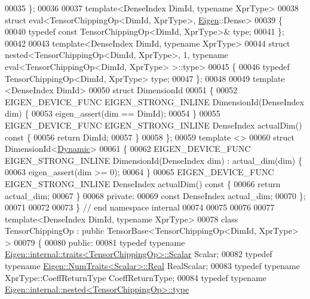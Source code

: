 \begin{DoxyCode}
00035 \};
00036 
00037 \textcolor{keyword}{template}<DenseIndex DimId, \textcolor{keyword}{typename} XprType>
00038 \textcolor{keyword}{struct }eval<TensorChippingOp<DimId, XprType>, \hyperlink{namespace_eigen}{Eigen}::Dense>
00039 \{
00040   \textcolor{keyword}{typedef} \textcolor{keyword}{const} TensorChippingOp<DimId, XprType>& type;
00041 \};
00042 
00043 \textcolor{keyword}{template}<DenseIndex DimId, \textcolor{keyword}{typename} XprType>
00044 \textcolor{keyword}{struct }nested<TensorChippingOp<DimId, XprType>, 1, typename eval<TensorChippingOp<DimId, XprType> >::type>
00045 \{
00046   \textcolor{keyword}{typedef} TensorChippingOp<DimId, XprType> type;
00047 \};
00048 
00049 \textcolor{keyword}{template} <DenseIndex DimId>
00050 \textcolor{keyword}{struct }DimensionId
00051 \{
00052   EIGEN\_DEVICE\_FUNC EIGEN\_STRONG\_INLINE DimensionId(DenseIndex dim) \{
00053     eigen\_assert(dim == DimId);
00054   \}
00055   EIGEN\_DEVICE\_FUNC EIGEN\_STRONG\_INLINE DenseIndex actualDim()\textcolor{keyword}{ const }\{
00056     \textcolor{keywordflow}{return} DimId;
00057   \}
00058 \};
00059 \textcolor{keyword}{template} <>
00060 \textcolor{keyword}{struct }DimensionId<\hyperlink{namespace_eigen_ad81fa7195215a0ce30017dfac309f0b2}{Dynamic}>
00061 \{
00062   EIGEN\_DEVICE\_FUNC EIGEN\_STRONG\_INLINE DimensionId(DenseIndex dim) : actual\_dim(dim) \{
00063     eigen\_assert(dim >= 0);
00064   \}
00065   EIGEN\_DEVICE\_FUNC EIGEN\_STRONG\_INLINE DenseIndex actualDim()\textcolor{keyword}{ const }\{
00066     \textcolor{keywordflow}{return} actual\_dim;
00067   \}
00068  \textcolor{keyword}{private}:
00069   \textcolor{keyword}{const} DenseIndex actual\_dim;
00070 \};
00071 
00072 
00073 \}  \textcolor{comment}{// end namespace internal}
00074 
00075 
00076 
00077 \textcolor{keyword}{template}<DenseIndex DimId, \textcolor{keyword}{typename} XprType>
00078 \textcolor{keyword}{class }TensorChippingOp : \textcolor{keyword}{public} TensorBase<TensorChippingOp<DimId, XprType> >
00079 \{
00080   \textcolor{keyword}{public}:
00081   \textcolor{keyword}{typedef} \textcolor{keyword}{typename} \hyperlink{struct_eigen_1_1internal_1_1traits}{Eigen::internal::traits<TensorChippingOp>::Scalar}
       Scalar;
00082   \textcolor{keyword}{typedef} \textcolor{keyword}{typename} \hyperlink{group___sparse_core___module}{Eigen::NumTraits<Scalar>::Real} RealScalar;
00083   \textcolor{keyword}{typedef} \textcolor{keyword}{typename} XprType::CoeffReturnType CoeffReturnType;
00084   \textcolor{keyword}{typedef} \textcolor{keyword}{typename} \hyperlink{class_eigen_1_1internal_1_1_tensor_lazy_evaluator_writable}{Eigen::internal::nested<TensorChippingOp>::type}

\end{DoxyCode}
